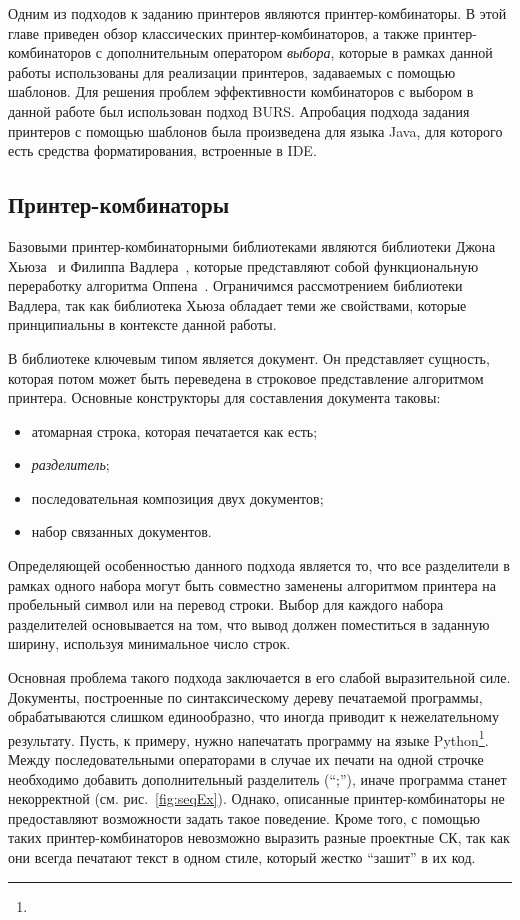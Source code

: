 Одним из подходов к заданию принтеров являются принтер-комбинаторы.
В этой главе приведен обзор классических принтер-комбинаторов, а также
принтер-комбинаторов с дополнительным оператором \emph{выбора}, которые
в рамках данной работы использованы для реализации принтеров, задаваемых
с помощью шаблонов. Для решения проблем эффективности
комбинаторов с выбором в данной работе был использован подход BURS.
Апробация подхода задания принтеров с помощью шаблонов
была произведена для языка Java, для которого есть средства форматирования,
встроенные в IDE.

\subsection{Принтер-комбинаторы}

Базовыми принтер-комбинаторными библиотеками являются библиотеки
Джона Хьюза~\cite{hughes} и Филиппа Вадлера~\cite{wadler}, которые
представляют собой функциональную переработку алгоритма
Оппена~\cite{oppen}.
Ограничимся рассмотрением библиотеки Вадлера, так как
библиотека Хьюза обладает теми же свойствами, которые принципиальны в контексте
данной работы.

В библиотеке ключевым типом является документ.
Он представляет сущность, которая потом может
быть переведена в строковое представление алгоритмом принтера.
Основные конструкторы для составления документа таковы:
\begin{itemize}
  \item атомарная строка, которая печатается как есть;
  \item \emph{разделитель};
  \item последовательная композиция двух документов;
  \item набор связанных документов.
\end{itemize}

Определяющей особенностью данного подхода является то, что все разделители
в рамках одного набора могут быть совместно заменены алгоритмом принтера
на пробельный символ или на перевод строки. Выбор для каждого набора разделителей
основывается на том, что вывод должен поместиться в заданную ширину,
используя минимальное число строк.

Основная проблема такого подхода заключается в его слабой выразительной силе.
Документы, построенные по синтаксическому дереву печатаемой программы,
обрабатываются слишком единообразно, что иногда приводит к нежелательному результату.
Пусть, к примеру, нужно напечатать программу на языке
Python\footnote{}.
Между последовательными операторами в случае их печати на одной строчке необходимо
добавить дополнительный разделитель (``;''), иначе программа станет некорректной
(см. рис.~\ref{fig:seqEx}). Однако, описанные принтер-комбинаторы не предоставляют
возможности задать такое поведение.
Кроме того, с помощью таких принтер-комбинаторов невозможно выразить разные проектные СК,
так как они всегда печатают текст в одном стиле, который жестко ``зашит'' в их код.

